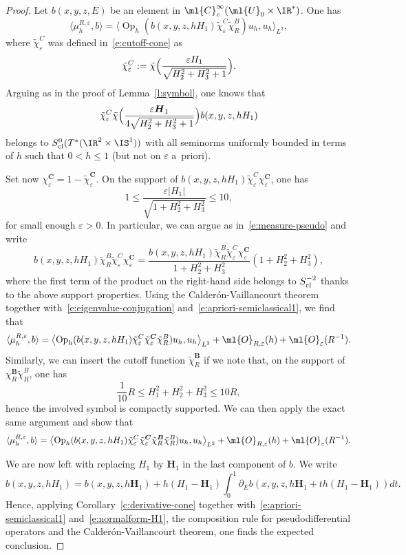 \documentclass[10pt]{amsart}
\theoremstyle{plain}
\theoremstyle{definition}
\theoremstyle{remark}
\newcommand{\Op}{\operatorname{Op}}
\begin{document}
\begin{proof} Let $b(x,y,z,E)$ be an element in $\ml{C}^\infty_c(\ml{U}_0\times\IR^*)$. One has
\[
\langle\mu_{h}^{R,\varepsilon},b\rangle=\bigl\langle \Op_h(b(x,y,z,hH_1)\tilde{\chi}_\varepsilon^C\tilde{\chi}_R^B)u_h,u_h\bigr\rangle_{L^2},
\]
where $\tilde{\chi}_\varepsilon^C$ was defined in~\eqref{e:cutoff-cone} as
\[
\tilde{\chi}_\varepsilon^C:=\tilde{\chi}\Bigl(\frac{\varepsilon H_1}{\sqrt{H_2^2+H_3^2+1}}\Bigr).
\]
Arguing as in the proof of Lemma~\ref{l:symbol}, one knows that
\[
\tilde{\chi}_\varepsilon^C\tilde{\chi}\Bigl(\frac{\varepsilon \boldsymbol{H}_1}{4\sqrt{H_2^2+H_3^2+1}}\Bigr)b(x,y,z,hH_1)
\]
belongs to $S^0_{\textup{cl}}(T^*(\IR^2\times\IS^1))$ with all seminorms uniformly bounded in terms of $h$ such that $0<h\leq 1$ (but not on $\varepsilon$ a~priori).

Set now $\chi_\varepsilon^{\boldsymbol{C}}=1-\tilde{\chi}_\varepsilon^{\boldsymbol{C}}$. On the support of $b(x,y,z,hH_1)\tilde{\chi}_\varepsilon^C\chi_\varepsilon^{\boldsymbol{C}}$, one has
\[
1\leq\frac{\varepsilon |H_1|}{\sqrt{1+H_2^2+H_3^2}}\leq 10,
\]
for small enough $\varepsilon>0$. In particular, we can argue as in~\eqref{e:measure-pseudo} and write
\[
b(x,y,z,hH_1)\tilde{\chi}_R^B\tilde{\chi}_\varepsilon^C\chi_\varepsilon^{\boldsymbol{C}}=\frac{b(x,y,z,hH_1)\tilde{\chi}_R^B\tilde{\chi}_\varepsilon^C\chi_\varepsilon^{\boldsymbol{C}}}{1+H_2^2+H_3^2}(1+H_2^2+H_3^2),
\]
where the first term of the product on the right-hand side belongs to $S^{-2}_{\textup{cl}}$ thanks to the above support properties. Using the Calderón-Vaillancourt theorem together with~\eqref{e:eigenvalue-conjugation} and~\eqref{e:apriori-semiclassical1}, we find that
\[
\langle\mu_{h}^{R,\varepsilon},b\rangle=\left\langle \Op_h(b(x,y,z,hH_1)\tilde{\chi}_\varepsilon^C\tilde{\chi}_\varepsilon^{\boldsymbol{C}}\tilde{\chi}_R^B)u_h,u_h\right\rangle_{L^2}+\ml{O}_{R,\varepsilon}(h)+\ml{O}_{\varepsilon}(R^{-1}).
\]
Similarly, we can insert the cutoff function $\tilde{\chi}_R^{\boldsymbol{B}}$ if we note that, on the support of $\chi_R^{\boldsymbol{B}}\tilde{\chi}_R^B$, one has
\[
\frac{1}{10}R\leq H_1^2+H_2^2+H_3^2\leq 10R,
\]
hence the involved symbol is compactly supported. We can then apply the exact same argument and show that
\[
\langle\mu_{h}^{R,\varepsilon},b\rangle=\left\langle \Op_h(b(x,y,z,hH_1)\tilde{\chi}_\varepsilon^C\tilde{\chi}_\varepsilon^{\boldsymbol{C}}\tilde{\chi}_R^{\boldsymbol{B}}\tilde{\chi}_R^B)u_h,u_h\right\rangle_{L^2}+\ml{O}_{R,\varepsilon}(h)+\ml{O}_{\varepsilon}(R^{-1}).
\]

We are now left with replacing $H_1$ by $\boldsymbol{H}_1$ in the last component of $b$. We write
\[
b(x,y,z,hH_1)=b(x,y,z,h\boldsymbol{H}_1)+h(H_1-\boldsymbol{H}_1)\int_0^1\partial_Eb(x,y,z,h\boldsymbol{H}_1+th(H_1-\boldsymbol{H}_1))dt.
\]
Hence, applying Corollary~\ref{c:derivative-cone} together with~\eqref{e:apriori-semiclassical1} and~\eqref{e:normalform-H1}, the composition rule for pseudodifferential operators and the Calderón-Vaillancourt theorem, one finds the expected conclusion.
\end{proof}
\end{document}
